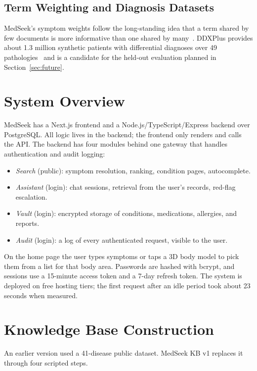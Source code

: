 \documentclass[conference]{IEEEtran}
\begin{document}
\subsection{Term Weighting and Diagnosis Datasets}

MedSeek's symptom weights follow the long-standing idea that a term shared by few documents is more informative than one shared by many~\cite{sparckjones1972,robertson2009}. DDXPlus provides about 1.3 million synthetic patients with differential diagnoses over 49 pathologies~\cite{fansi2022} and is a candidate for the held-out evaluation planned in Section~\ref{sec:future}.

\section{System Overview}

MedSeek has a Next.js frontend and a Node.js/TypeScript/Express backend over PostgreSQL. All logic lives in the backend; the frontend only renders and calls the API. The backend has four modules behind one gateway that handles authentication and audit logging:
\begin{itemize}
\item \textit{Search} (public): symptom resolution, ranking, condition pages, autocomplete.
\item \textit{Assistant} (login): chat sessions, retrieval from the user's records, red-flag escalation.
\item \textit{Vault} (login): encrypted storage of conditions, medications, allergies, and reports.
\item \textit{Audit} (login): a log of every authenticated request, visible to the user.
\end{itemize}

On the home page the user types symptoms or taps a 3D body model to pick them from a list for that body area. Passwords are hashed with bcrypt, and sessions use a 15-minute access token and a 7-day refresh token. The system is deployed on free hosting tiers; the first request after an idle period took about 23 seconds when measured.

\section{Knowledge Base Construction}

An earlier version used a 41-disease public dataset. MedSeek KB v1 replaces it through four scripted steps.
\end{document}

